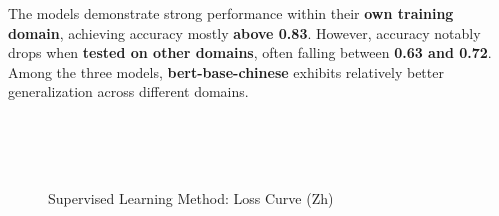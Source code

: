 \documentclass[lettersize,journal]{IEEEtran}
\begin{document}
The models demonstrate strong performance within their \textbf{own training domain}, achieving accuracy mostly \textbf{above 0.83}. However, accuracy notably drops when \textbf{tested on other domains}, often falling between \textbf{0.63 and 0.72}. Among the three models, \textbf{bert-base-chinese} exhibits relatively better generalization across different domains.


\begin{figure}[H]
    \centering
    \\
    \\
    \\
        \caption{Supervised Learning Method: Loss Curve (Zh)}
\end{figure}
\end{document}
